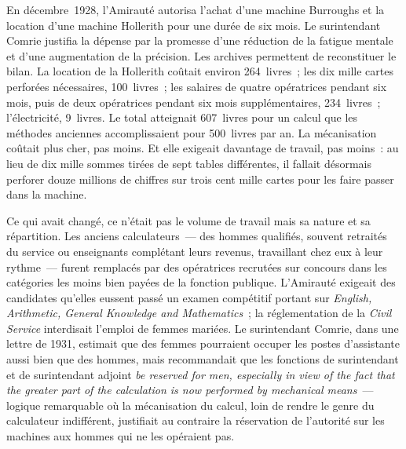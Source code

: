 En décembre~1928, l'Amirauté autorisa l'achat d'une machine Burroughs et la location d'une machine Hollerith pour une durée de six mois. Le surintendant Comrie justifia la dépense par la promesse d'une réduction de la fatigue mentale et d'une augmentation de la précision. Les archives permettent de reconstituer le bilan. La location de la Hollerith coûtait environ 264~livres~; les dix mille cartes perforées nécessaires, 100~livres~; les salaires de quatre opératrices pendant six mois, puis de deux opératrices pendant six mois supplémentaires, 234~livres~; l'électricité, 9~livres. Le total atteignait 607~livres pour un calcul que les méthodes anciennes accomplissaient pour 500~livres par an. La mécanisation coûtait plus cher, pas moins. Et elle exigeait davantage de travail, pas moins~: au lieu de dix mille sommes tirées de sept tables différentes, il fallait désormais perforer douze millions de chiffres sur trois cent mille cartes pour les faire passer dans la machine.

%
Ce qui avait changé, ce n'était pas le volume de travail mais sa nature et sa répartition. Les anciens calculateurs~--- des hommes qualifiés, souvent retraités du service ou enseignants complétant leurs revenus, travaillant chez eux à leur rythme~--- furent remplacés par des opératrices recrutées sur concours dans les catégories les moins bien payées de la fonction publique. L'Amirauté exigeait des candidates qu'elles eussent passé un examen compétitif portant sur \og \emph{English, Arithmetic, General Knowledge and Mathematics}\fg{}~; la réglementation de la \emph{Civil Service} interdisait l'emploi de femmes mariées. Le surintendant Comrie, dans une lettre de 1931, estimait que des femmes pourraient occuper les postes d'assistante aussi bien que des hommes, mais recommandait que les fonctions de surintendant et de surintendant adjoint \og \emph{be reserved for men, especially in view of the fact that the greater part of the calculation is now performed by mechanical means}\fg{}~--- logique remarquable où la mécanisation du calcul, loin de rendre le genre du calculateur indifférent, justifiait au contraire la réservation de l'autorité sur les machines aux hommes qui ne les opéraient pas.

